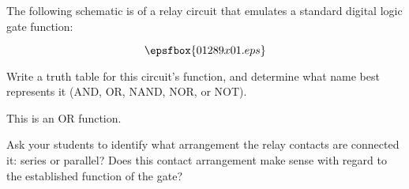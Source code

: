 

The following schematic is of a relay circuit that emulates a standard digital logic gate function:

$$\epsfbox{01289x01.eps}$$

Write a truth table for this circuit's function, and determine what name best represents it (AND, OR, NAND, NOR, or NOT).







This is an OR function.







Ask your students to identify what arrangement the relay contacts are connected it: series or parallel?  Does this contact arrangement make sense with regard to the established function of the gate?




